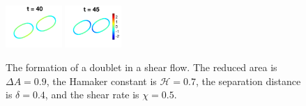 \documentclass[prf,superscriptaddress,showkeys,longbibliography]{revtex4-1}
\begin{document}
\begin{figure}[htp]
  \includegraphics[width=0.19\textwidth]{figs/adR4em1adS7em1Chi5em1_ra090_image09.png}
  \includegraphics[width=0.19\textwidth]{figs/adR4em1adS7em1Chi5em1_ra090_image10.png}
  \caption{\label{fig:doublet090-weakAdhesion} The formation of a
  doublet in a shear flow.  The reduced area is $\Delta A = 0.9$, the
  Hamaker constant is $\mathcal{H}=0.7$, the separation distance is
  $\delta = 0.4$, and the shear rate is $\chi=0.5$.}
\end{figure}
\end{document}
